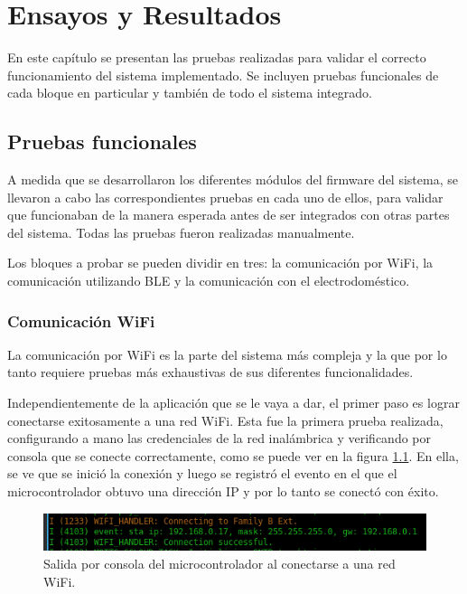 
\chapter{Ensayos y Resultados} %
\label{Chapter4}

En este capítulo se presentan las pruebas realizadas para validar el correcto funcionamiento del sistema implementado. Se incluyen pruebas funcionales de cada bloque en particular y también de todo el sistema integrado.

\section{Pruebas funcionales}

A medida que se desarrollaron los diferentes módulos del firmware del sistema, se llevaron a cabo las correspondientes pruebas en cada uno de ellos, para validar que funcionaban de la manera esperada antes de ser integrados con otras partes del sistema. Todas las pruebas fueron realizadas manualmente.

Los bloques a probar se pueden dividir en tres: la comunicación por WiFi, la comunicación utilizando BLE y la comunicación con el electrodoméstico.

\subsection{Comunicación WiFi}

La comunicación por WiFi es la parte del sistema más compleja y la que por lo tanto requiere pruebas más exhaustivas de sus diferentes funcionalidades.

Independientemente de la aplicación que se le vaya a dar, el primer paso es lograr conectarse exitosamente a una red WiFi. Esta fue la primera prueba realizada, configurando a mano las credenciales de la red inalámbrica y verificando por consola que se conecte correctamente, como se puede ver en la figura \ref{fig:output_wifi_connection}. En ella, se ve que se inició la conexión y luego se registró el evento en el que el microcontrolador obtuvo una dirección IP y por lo tanto se conectó con éxito.

\begin{figure}[h]
\centering
\includegraphics[width=\textwidth]{./Figures/output_wifi_connection.png}
\caption{Salida por consola del microcontrolador al conectarse a una red WiFi.}
\label{fig:output_wifi_connection}
\end{figure}

